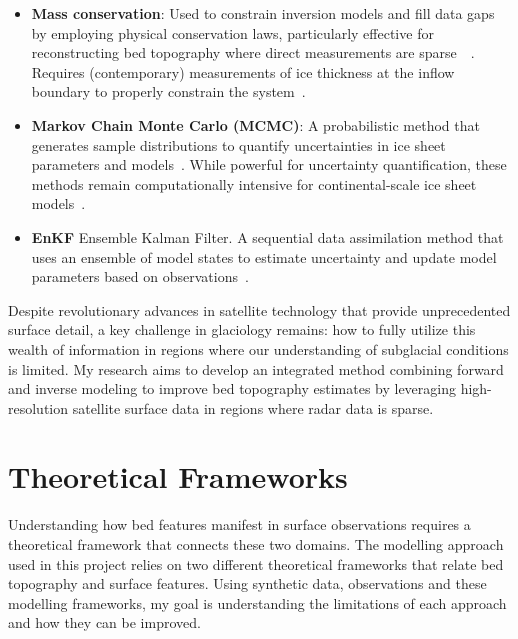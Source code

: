 \begin{itemize}
\begin{itemize}
            \item\textbf{Mass conservation}: Used to constrain inversion models and fill data gaps by employing physical conservation laws, particularly effective for reconstructing bed topography where direct measurements are sparse~~\cite{Morlighem_2017, Morlighem_2020}. Requires (contemporary) measurements of ice thickness at the inflow boundary to properly constrain the system~\cite{Morlighem_Goldberg_2024}.

            \item\textbf{Markov Chain Monte Carlo (MCMC)}: A probabilistic method that generates sample distributions to quantify uncertainties in ice sheet parameters and models~\cite{Morlighem_Goldberg_2024}. While powerful for uncertainty quantification, these methods remain computationally intensive for continental-scale ice sheet models~\cite{Morlighem_Goldberg_2024}.

            \item\textbf{EnKF} Ensemble Kalman Filter. A sequential data assimilation method that uses an ensemble of model states to estimate uncertainty and update model parameters based on observations~\cite{Morlighem_Goldberg_2024}.
        \end{itemize}
    
\end{itemize} 

Despite revolutionary advances in satellite technology that provide unprecedented surface detail, a key challenge in glaciology remains: how to fully utilize this wealth of information in regions where our understanding of subglacial conditions is limited. My research aims to develop an integrated method combining forward and inverse modeling to improve bed topography estimates by leveraging high-resolution satellite surface data in regions where radar data is sparse.%

\newpage
\section{Theoretical Frameworks}\label{theoretical_frameworks}
 Understanding how bed features manifest in surface observations requires a theoretical framework that connects these two domains. The modelling approach used in this project relies on two different theoretical frameworks that relate bed topography and surface features. Using synthetic data, observations and these modelling frameworks, my goal is understanding the limitations of each approach and how they can be improved.

